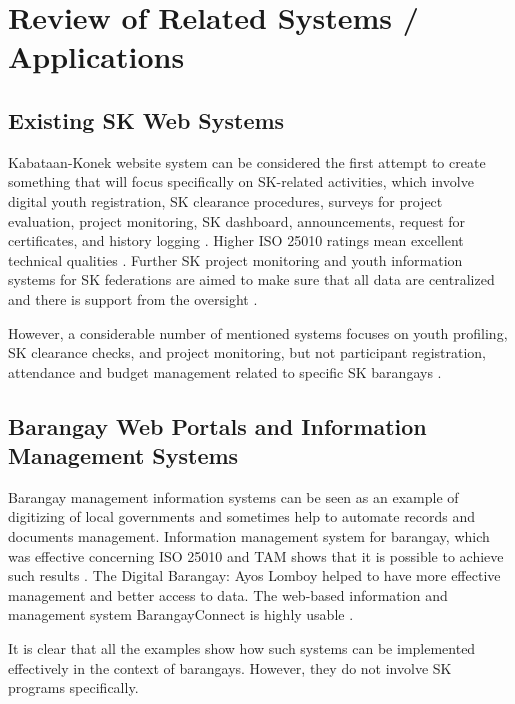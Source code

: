 \section{Review of Related Systems / Applications}

\subsection{Existing SK Web Systems}

\hspace*{\parindent}Kabataan-Konek website system can be considered the first attempt to create something that will focus specifically on SK-related activities, which involve digital youth registration, SK clearance procedures, surveys for project evaluation, project monitoring, SK dashboard, announcements, request for certificates, and history logging \cite{E}. Higher ISO 25010 ratings mean excellent technical qualities \cite{E}. Further SK project monitoring and youth information systems for SK federations are aimed to make sure that all data are centralized and there is support from the oversight \cite{E}.
\vspace{5mm}

\hspace*{\parindent}However, a considerable number of mentioned systems focuses on youth profiling, SK clearance checks, and project monitoring, but not participant registration, attendance and budget management related to specific SK barangays \cite{E,J,K,AC}.
\vspace{5mm}

\subsection{Barangay Web Portals and Information Management Systems}

\hspace*{\parindent}Barangay management information systems can be seen as an example of digitizing of local governments and sometimes help to automate records and documents management. Information management system for barangay, which was effective concerning ISO 25010 and TAM shows that it is possible to achieve such results \cite{AM}. The Digital Barangay: Ayos Lomboy \cite{V} helped to have more effective management and better access to data. The web-based information and management system BarangayConnect is highly usable \cite{AM}.
\vspace{5mm}

\hspace*{\parindent}It is clear that all the examples show how such systems can be implemented effectively in the context of barangays. However, they do not involve SK programs specifically.
\vspace{5mm}

